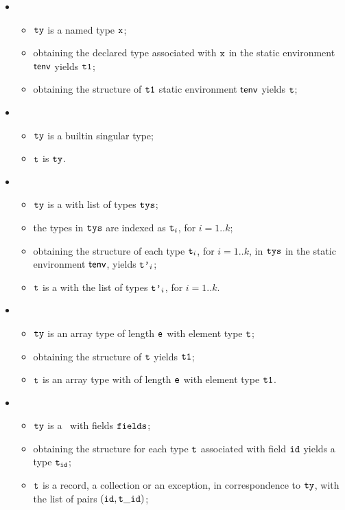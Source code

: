 \ProseParagraph
\OneApplies
\begin{itemize}
\item {}
  \begin{itemize}
  \item $\texttt{ty}$ is a named type $\texttt{x}$;
  \item obtaining the declared type associated with $\texttt{x}$ in the static environment $\textsf{tenv}$ yields $\texttt{t1}$\ProseOrTypeError;
  \item obtaining the structure of $\texttt{t1}$ static environment $\textsf{tenv}$ yields $\texttt{t}$\ProseOrTypeError;
  \end{itemize}
\item {}
  \begin{itemize}
  \item $\texttt{ty}$ is a builtin singular type;
  \item $\texttt{t}$ is $\texttt{ty}$.
  \end{itemize}
\item {}
  \begin{itemize}
  \item $\texttt{ty}$ is a \tupletypeterm{} with list of types $\texttt{tys}$;
  \item the types in $\texttt{tys}$ are indexed as $\texttt{t}_i$, for $i=1..k$;
  \item obtaining the structure of each type $\texttt{t}_i$, for $i=1..k$, in $\texttt{tys}$ in the static environment $\textsf{tenv}$,
  yields $\texttt{t'}_i$\ProseOrTypeError;
  \item $\texttt{t}$ is a \tupletypeterm{} with the list of types $\texttt{t'}_i$, for $i=1..k$.
  \end{itemize}
\item {}
  \begin{itemize}
    \item $\texttt{ty}$ is an array type of length $\texttt{e}$ with element type $\texttt{t}$;
    \item obtaining the structure of $\texttt{t}$ yields $\texttt{t1}$\ProseOrTypeError;
    \item $\texttt{t}$ is an array type with of length $\texttt{e}$ with element type $\texttt{t1}$.
  \end{itemize}
\item {}
  \begin{itemize}
  \item $\texttt{ty}$ is a \structuredtype\ with fields $\texttt{fields}$;
  \item obtaining the structure for each type $\texttt{t}$ associated with field $\texttt{id}$ yields a type $\texttt{t}_{\texttt{id}}$\ProseOrTypeError;
  \item $\texttt{t}$ is a record, a collection or an exception, in correspondence to $\texttt{ty}$, with the list of pairs $(\texttt{id}, \texttt{t}\_\texttt{id})$;
  \end{itemize}
\end{itemize}


